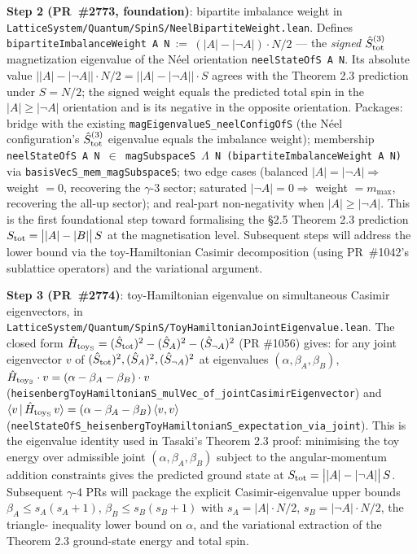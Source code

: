 \documentclass[a4paper,11pt]{article}
\begin{document}
\textbf{Step 2 (PR~\#2773, foundation)}: bipartite imbalance
weight in
\texttt{LatticeSystem/Quantum/SpinS/NeelBipartiteWeight.lean}.
Defines \texttt{bipartiteImbalanceWeight A N}~:=~$(|A| - |\neg A|)
\cdot N/2$ — the \emph{signed} $\hat S_{\rm tot}^{(3)}$
magnetization eigenvalue of the Néel orientation
\texttt{neelStateOfS A N}. Its absolute value
$\bigl||A| - |\neg A|\bigr|\cdot N/2 = \bigl||A| - |\neg A|\bigr|\cdot S$
agrees with the Theorem 2.3 prediction under $S = N/2$; the signed
weight equals the predicted total spin in the $|A| \ge |\neg A|$
orientation and is its negative in the opposite orientation.
Packages: bridge with the existing
\texttt{magEigenvalueS\_neelConfigOfS} (the Néel configuration's
$\hat S_{\rm tot}^{(3)}$ eigenvalue equals the imbalance weight);
membership
\texttt{neelStateOfS A N $\in$ magSubspaceS $\Lambda$ N (bipartiteImbalanceWeight A N)}
via \texttt{basisVecS\_mem\_magSubspaceS}; two edge cases
(balanced $|A|=|\neg A| \Rightarrow$ weight $=0$, recovering the
$\gamma$-3 sector; saturated $|\neg A| = 0 \Rightarrow$ weight
$= m_{\max}$, recovering the all-up sector); and
real-part non-negativity when $|A| \ge |\neg A|$. This is the
first foundational step toward formalising the §2.5 Theorem 2.3
prediction $S_{\rm tot} = \bigl||A| - |B|\bigr|\,S$ at the
magnetisation level. Subsequent steps will address the lower
bound via the toy-Hamiltonian Casimir decomposition (using
PR~\#1042's sublattice operators) and the variational argument.

\textbf{Step 3 (PR~\#2774)}: toy-Hamiltonian eigenvalue on
simultaneous Casimir eigenvectors, in
\texttt{LatticeSystem/Quantum/SpinS/ToyHamiltonianJointEigenvalue.lean}.
The closed form
$\hat H_{\rm toy_S} = (\hat S_{\rm tot})^2 - (\hat S_A)^2 -
(\hat S_{\neg A})^2$ (PR \#1056) gives: for any joint eigenvector
$v$ of $(\hat S_{\rm tot})^2, (\hat S_A)^2, (\hat S_{\neg A})^2$ at
eigenvalues $(\alpha, \beta_A, \beta_B)$, $\hat H_{\rm toy_S}\cdot
v = (\alpha - \beta_A - \beta_B)\cdot v$
(\texttt{heisenbergToyHamiltonianS\_mulVec\_of\_jointCasimirEigenvector})
and $\langle v\,|\,\hat H_{\rm toy_S}\,v\rangle = (\alpha - \beta_A
- \beta_B)\,\langle v, v\rangle$
(\texttt{neelStateOfS\_heisenbergToyHamiltonianS\_expectation\_via\_joint}).
This is the eigenvalue identity used in Tasaki's Theorem 2.3
proof: minimising the toy energy over admissible joint
$(\alpha, \beta_A, \beta_B)$ subject to the angular-momentum
addition constraints gives the predicted ground state at
$S_{\rm tot} = \bigl||A| - |\neg A|\bigr|\,S$. Subsequent $\gamma$-4 PRs
will package the explicit Casimir-eigenvalue upper bounds
$\beta_A \le s_A(s_A+1)$, $\beta_B \le s_B(s_B+1)$ with
$s_A = |A|\cdot N/2$, $s_B = |\neg A|\cdot N/2$, the triangle-
inequality lower bound on $\alpha$, and the variational extraction
of the Theorem 2.3 ground-state energy and total spin.
\end{document}
